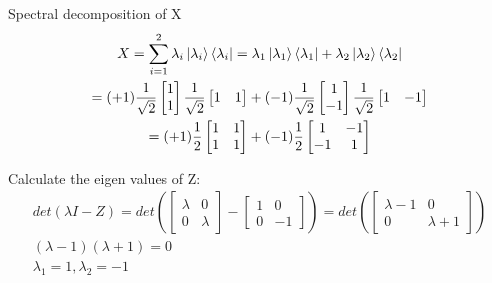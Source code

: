 \documentclass[]{article}
\begin{document}
\begin{enumerate}
\begin{enumerate}
          Spectral decomposition of X
          \begin{gather*}
            X = \sum_{i=1}^{2} \lambda_i \ket{\lambda_i}\bra{\lambda_i}
            = \lambda_1 \ket{\lambda_1}\bra{\lambda_1} + \lambda_2 \ket{\lambda_2}\bra{\lambda_2}\\
            = (+1) \frac{1}{\sqrt{2}} \begin{bmatrix}1\\1\end{bmatrix}
            \frac{1}{\sqrt{2}} \begin{bmatrix}1&1\end{bmatrix}
            + (-1) \frac{1}{\sqrt{2}} \begin{bmatrix}1\\-1\end{bmatrix}
            \frac{1}{\sqrt{2}} \begin{bmatrix}1&-1\end{bmatrix}\\
            = (+1) \frac{1}{2} \begin{bmatrix}1&1\\1&1\end{bmatrix} 
            + (-1) \frac{1}{2} \begin{bmatrix}1&-1\\-1&1\end{bmatrix}
          \end{gather*}

          Calculate the eigen values of Z:
          \begin{gather*}
            det(\lambda I - Z) = det(
            \begin{bmatrix}
              \lambda & 0\\
              0 & \lambda
            \end{bmatrix}
            - 
            \begin{bmatrix}
              1 & 0\\
              0 & -1
            \end{bmatrix}
            ) = 
            det (
            \begin{bmatrix}
              \lambda - 1 & 0\\
              0 & \lambda + 1
            \end{bmatrix}
            )\\
            (\lambda - 1) (\lambda + 1) = 0\\
            \lambda_1 = 1, \lambda_2 = -1
          \end{gather*}



\end{enumerate}
\end{enumerate}
\end{document}
